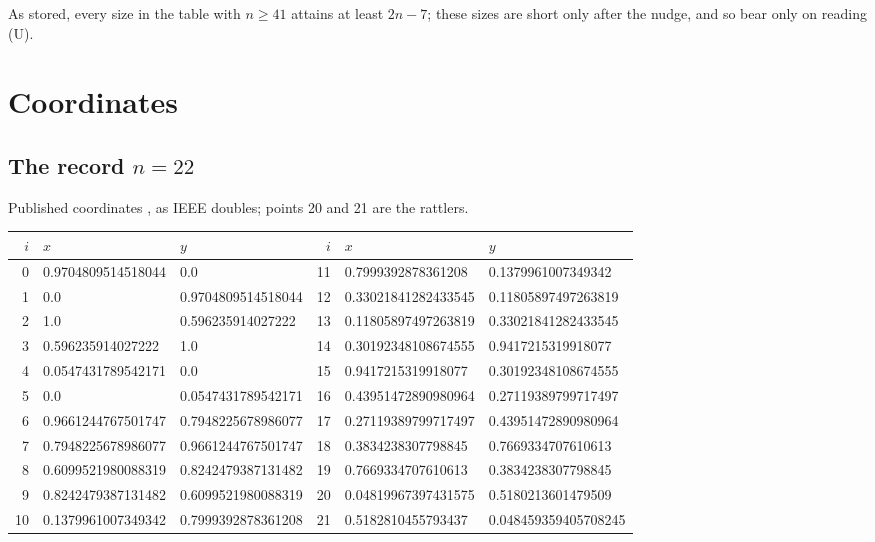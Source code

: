 \documentclass[11pt]{amsart}
\theoremstyle{definition}
\begin{document}
As stored, every size in the table with $n \ge 41$ attains at least $2n-7$; these sizes are short only after the nudge, and so bear only on reading (U). %

\section{Coordinates}\label{app:coords}

\subsection*{The record \texorpdfstring{$n = 22$}{n = 22}}
Published coordinates \cite{Stead}, as IEEE doubles; points 20 and 21 are the rattlers. %
\begin{center}\small
\begin{tabular}{@{}rll@{\hspace{2.5em}}rll@{}}
\toprule
$i$ & $x$ & $y$ & $i$ & $x$ & $y$ \\
\midrule
0 & 0.9704809514518044 & 0.0 & 11 & 0.7999392878361208 & 0.1379961007349342 \\
1 & 0.0 & 0.9704809514518044 & 12 & 0.33021841282433545 & 0.11805897497263819 \\
2 & 1.0 & 0.596235914027222 & 13 & 0.11805897497263819 & 0.33021841282433545 \\
3 & 0.596235914027222 & 1.0 & 14 & 0.30192348108674555 & 0.9417215319918077 \\
4 & 0.0547431789542171 & 0.0 & 15 & 0.9417215319918077 & 0.30192348108674555 \\
5 & 0.0 & 0.0547431789542171 & 16 & 0.43951472890980964 & 0.27119389799717497 \\
6 & 0.9661244767501747 & 0.7948225678986077 & 17 & 0.27119389799717497 & 0.43951472890980964 \\
7 & 0.7948225678986077 & 0.9661244767501747 & 18 & 0.3834238307798845 & 0.7669334707610613 \\
8 & 0.6099521980088319 & 0.8242479387131482 & 19 & 0.7669334707610613 & 0.3834238307798845 \\
9 & 0.8242479387131482 & 0.6099521980088319 & 20 & 0.04819967397431575 & 0.5180213601479509 \\
10 & 0.1379961007349342 & 0.7999392878361208 & 21 & 0.5182810455793437 & 0.048459359405708245 \\
\bottomrule
\end{tabular}
\end{center}
\end{document}
